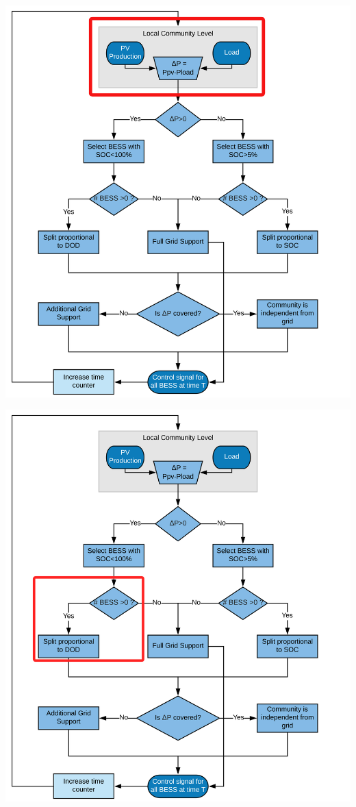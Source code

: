 \documentclass[xcolor=dvipsnames,aspectratio=169]{beamer} %
\begin{document}
{\begin{frame}[t]
\begin{minipage}{0.35\textwidth}
\begin{overprint}
  \centerline{\includegraphics[width=\textwidth]{Immagini/SplitGeneral.jpg}}%
  \centerline{\includegraphics[width=\textwidth]{Immagini/SplitDOD.jpg}}%

\end{overprint}
\end{minipage}
\end{frame}}
\end{document}
